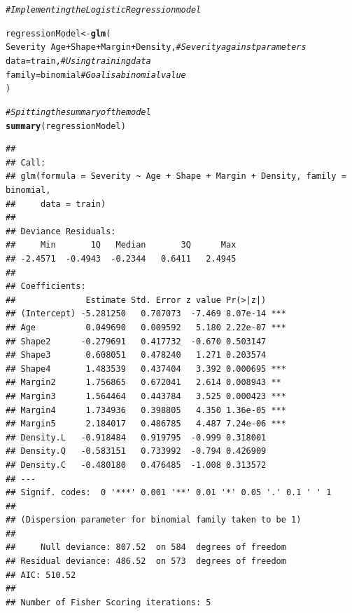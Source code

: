 \documentclass[a4paper,12pt]{article}\usepackage[]{graphicx}\usepackage[]{color}
\makeatletter
\newcommand{\hlcom}[1]{\textcolor[rgb]{0.678,0.584,0.686}{\textit{#1}}}%
\newcommand{\hlopt}[1]{\textcolor[rgb]{0,0,0}{#1}}%
\newcommand{\hlstd}[1]{\textcolor[rgb]{0.345,0.345,0.345}{#1}}%
\newcommand{\hlkwb}[1]{\textcolor[rgb]{0.69,0.353,0.396}{#1}}%
\newcommand{\hlkwc}[1]{\textcolor[rgb]{0.333,0.667,0.333}{#1}}%
\newcommand{\hlkwd}[1]{\textcolor[rgb]{0.737,0.353,0.396}{\textbf{#1}}}%
\newenvironment{kframe}{%
 \def\at@end@of@kframe{}%
 \ifinner\ifhmode%
  \def\at@end@of@kframe{\end{minipage}}%
  \begin{minipage}{\columnwidth}%
 \fi\fi%
 \def\FrameCommand##1{\hskip\@totalleftmargin \hskip-\fboxsep
 \colorbox{shadecolor}{##1}\hskip-\fboxsep
     \hskip-\linewidth \hskip-\@totalleftmargin \hskip\columnwidth}%
 \MakeFramed {\advance\hsize-\width
   \@totalleftmargin\z@ \linewidth\hsize
   \@setminipage}}%
 {\par\unskip\endMakeFramed%
 \at@end@of@kframe}
\newenvironment{knitrout}{}{} %
\makeatother
\begin{document}
\begin{knitrout}
\color{fgcolor}\begin{kframe}
\begin{alltt}
\hlcom{# Implementing the Logistic Regression model}

\hlstd{regressionModel} \hlkwb{<-} \hlkwd{glm}\hlstd{(}
  \hlstd{Severity} \hlopt{~} \hlstd{Age}\hlopt{+}\hlstd{Shape}\hlopt{+}\hlstd{Margin}\hlopt{+}\hlstd{Density,} \hlcom{# Severity against parameters}
  \hlkwc{data}\hlstd{=train,}                          \hlcom{# Using training data}
  \hlkwc{family}\hlstd{=binomial}                      \hlcom{# Goal is a binomial value}
\hlstd{)}

\hlcom{# Spitting the summary of the model}
\hlkwd{summary}\hlstd{(regressionModel)}
\end{alltt}
\begin{verbatim}
## 
## Call:
## glm(formula = Severity ~ Age + Shape + Margin + Density, family = binomial, 
##     data = train)
## 
## Deviance Residuals: 
##     Min       1Q   Median       3Q      Max  
## -2.4571  -0.4943  -0.2344   0.6411   2.4945  
## 
## Coefficients:
##              Estimate Std. Error z value Pr(>|z|)    
## (Intercept) -5.281250   0.707073  -7.469 8.07e-14 ***
## Age          0.049690   0.009592   5.180 2.22e-07 ***
## Shape2      -0.279691   0.417732  -0.670 0.503147    
## Shape3       0.608051   0.478240   1.271 0.203574    
## Shape4       1.483539   0.437404   3.392 0.000695 ***
## Margin2      1.756865   0.672041   2.614 0.008943 ** 
## Margin3      1.564464   0.443784   3.525 0.000423 ***
## Margin4      1.734936   0.398805   4.350 1.36e-05 ***
## Margin5      2.184017   0.486785   4.487 7.24e-06 ***
## Density.L   -0.918484   0.919795  -0.999 0.318001    
## Density.Q   -0.583151   0.733992  -0.794 0.426909    
## Density.C   -0.480180   0.476485  -1.008 0.313572    
## ---
## Signif. codes:  0 '***' 0.001 '**' 0.01 '*' 0.05 '.' 0.1 ' ' 1
## 
## (Dispersion parameter for binomial family taken to be 1)
## 
##     Null deviance: 807.52  on 584  degrees of freedom
## Residual deviance: 486.52  on 573  degrees of freedom
## AIC: 510.52
## 
## Number of Fisher Scoring iterations: 5
\end{verbatim}
\end{kframe}
\end{knitrout}
\end{document}
